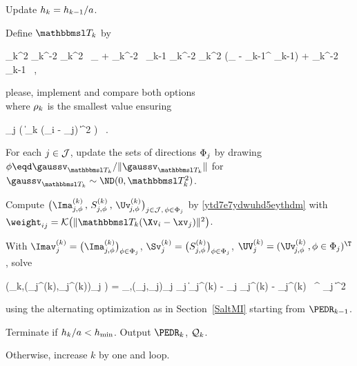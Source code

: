\begin{mylist}

\item
Update \( h_{k} = h_{k-1} / a \).

\item
Define \( \TEDR_{k} \) by
\begin{EQA}[c]
	\TEDR_{k}^{2}
	\eqdef
	\hiso_{k}^{-2} \aniso_{k}^{2} \, \Id_{\dimd} + \hiso_{k}^{-2} \, \JEDR_{k-1}
	\qquad
	\quad
	\hiso_{k}^{-2} \aniso_{k}^{2} (\Id_{\dimd} - \PEDR_{k-1}^{\T} \PEDR_{k-1}) + \hiso_{k}^{-2} \, \JEDR_{k-1}
	\, ,
\end{EQA}
{\color{blue} please, implement and compare both options}
\\
where \( \rho_{k} \) is the smallest value ensuring 
\begin{EQA}[c]
	 \sum_{j \in \JJJ} \sumi 
		\Kern\bigl( \| \TEDR_{k} (\Xv_{i} - \xv_{j}) \|^{2} \bigr)
	\geq 
	\nmin
	\, .
\label{jhgiverkytde4w34etycjam}
\end{EQA}

\item
For each \( j \in \mathcal{J} \), 
update the sets of directions \( \Phi_{j} \) by drawing \( \sph \eqd \gaussv_{\TEDR_{k}}/\| \gaussv_{\TEDR_{k}} \| \)
for \( \gaussv_{\TEDR_{k}} \sim \ND(0,\TEDR_{k}^{2}) \).

\item 
Compute \( \bigl( \Ima_{j,\sph}^{(k)} \, , \, S_{j,\sph}^{(k)} \, , \, \Uv_{\jm,\sph}^{(k)} \bigr)_{j \in \JJJ , \, \sph \in \Sph_{j}} \) 
by \eqref{ytd7e7ydwuhd5eythdm} with \( \weight_{ij} = \Kern\bigl( \| \TEDR_{k} (\Xv_{i} - \xv_{j}) \|^{2} \bigr) \).

\item
With 
\( \Imav_{j}^{(k)} = \bigl( \Ima_{j,\sph}^{(k)} \bigr)_{\sph \in \Sph_{j}} \),
\( \Sv_{j}^{(k)} = \bigl( S_{j,\sph}^{(k)} \bigr)_{\sph \in \Sph_{j}} \),
\( \UV_{j}^{(k)} = (\Uv_{\jm,\sph}^{(k)} \, , \sph \in \Sph_{j})^{\T} \),
solve
\begin{EQA}[c]
	(\PEDR_{k},(\fcn_{j}^{(k)},\fclv_{j}^{(k)})_{j \in \JJJ})
	=
	\arginf_{\PEDR,(\fcn_{j},\fclv_{j})_{j \in \JJJ}}
	\sum_{j \in \JJJ} \bigl\| \Imav_{j}^{(k)} - \fcn_{j} \Sv_{j}^{(k)} - \UV_{j}^{(k)} \, \PEDR^{\T} \fclv_{j} \bigr\|^{2} 
	\, 
\end{EQA}
using the alternating optimization as in Section~\ref{SaltMI} starting from \( \PEDR_{k-1} \).

\item
Terminate if \( h_{k}/a < h_{\min} \).
Output \( \PEDR_{k} \), \( \mathcal{Q}_{k} \).

\item 
Otherwise, increase \( k \) by one and loop. 

\end{mylist}

